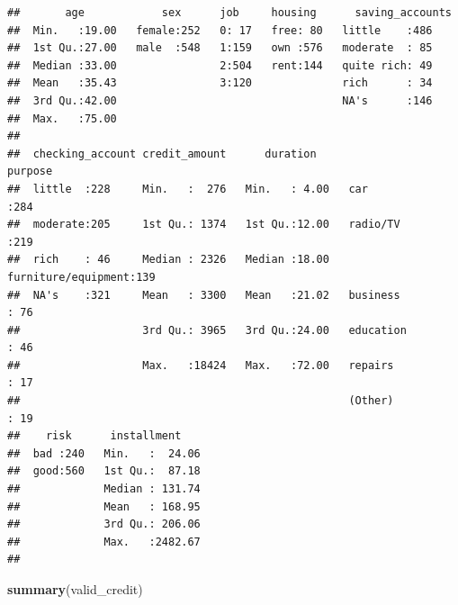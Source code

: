 \documentclass[
]{book}
\newenvironment{Shaded}{\begin{snugshade}}{\end{snugshade}}
\newcommand{\DataTypeTok}[1]{\textcolor[rgb]{0.13,0.29,0.53}{#1}}
\newcommand{\DecValTok}[1]{\textcolor[rgb]{0.00,0.00,0.81}{#1}}
\newcommand{\FloatTok}[1]{\textcolor[rgb]{0.00,0.00,0.81}{#1}}
\newcommand{\KeywordTok}[1]{\textcolor[rgb]{0.13,0.29,0.53}{\textbf{#1}}}
\newcommand{\NormalTok}[1]{#1}
\newcommand{\OperatorTok}[1]{\textcolor[rgb]{0.81,0.36,0.00}{\textbf{#1}}}
\newcommand{\StringTok}[1]{\textcolor[rgb]{0.31,0.60,0.02}{#1}}
\begin{document}
\begin{Shaded}
\end{Shaded}

\begin{verbatim}
##       age            sex      job     housing      saving_accounts
##  Min.   :19.00   female:252   0: 17   free: 80   little    :486   
##  1st Qu.:27.00   male  :548   1:159   own :576   moderate  : 85   
##  Median :33.00                2:504   rent:144   quite rich: 49   
##  Mean   :35.43                3:120              rich      : 34   
##  3rd Qu.:42.00                                   NA's      :146   
##  Max.   :75.00                                                    
##                                                                   
##  checking_account credit_amount      duration                    purpose   
##  little  :228     Min.   :  276   Min.   : 4.00   car                :284  
##  moderate:205     1st Qu.: 1374   1st Qu.:12.00   radio/TV           :219  
##  rich    : 46     Median : 2326   Median :18.00   furniture/equipment:139  
##  NA's    :321     Mean   : 3300   Mean   :21.02   business           : 76  
##                   3rd Qu.: 3965   3rd Qu.:24.00   education          : 46  
##                   Max.   :18424   Max.   :72.00   repairs            : 17  
##                                                   (Other)            : 19  
##    risk      installment     
##  bad :240   Min.   :  24.06  
##  good:560   1st Qu.:  87.18  
##             Median : 131.74  
##             Mean   : 168.95  
##             3rd Qu.: 206.06  
##             Max.   :2482.67  
## 
\end{verbatim}

\begin{Shaded}
\begin{Highlighting}[]
\KeywordTok{summary}\NormalTok{(valid_credit)}
\end{Highlighting}
\end{Shaded}
\end{document}
